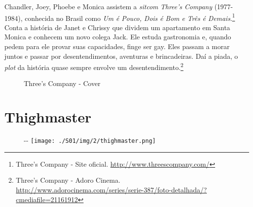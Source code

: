 \saveparinfos
\noindent
\begin{minipage}[c]{0.5\textwidth}\useparinfo

Chandler, Joey, Phoebe e Monica assistem a \emph{sitcom} \emph{Three's
Company} (1977-1984), conhecida no Brasil como \emph{Um é Pouco, Dois é
Bom e Três é Demais}.\footnote{\sloppy Three’s Company - Site oficial. \url{http://www.threescompany.com/}}
Conta a história de Janet e Chrissy que dividem um apartamento em Santa
Monica e conhecem um novo colega Jack. Ele estuda gastronomia e, quando
pedem para ele provar suas capacidades, finge ser gay. Eles passam a
morar juntos e passar por desentendimentos, aventuras e brincadeiras.
Daí a piada, o \emph{plot} da história quase sempre envolve um
desentendimento.\footnote{\sloppy Three’s Company - Adoro Cinema. \url{http://www.adorocinema.com/series/serie-387/foto-detalhada/?cmediafile=21161912}}

\end{minipage}\hfill
\begin{minipage}[c]{0.5\textwidth}

\begin{figure}
  \centering
    \caption{Three’s Company - Cover\label{fig:three-s-company-cover}}
\end{figure}

\end{minipage}

\hypertarget{thighmaster}{%
\section{Thighmaster}\label{thighmaster}}

\begin{figure}[!ht]
  \begin{adjustwidth}{-\oddsidemargin-1in}{-\rightmargin}
    \centering
    \texttt{[image: ./S01/img/2/thighmaster.png]}
  \end{adjustwidth}
\end{figure}

